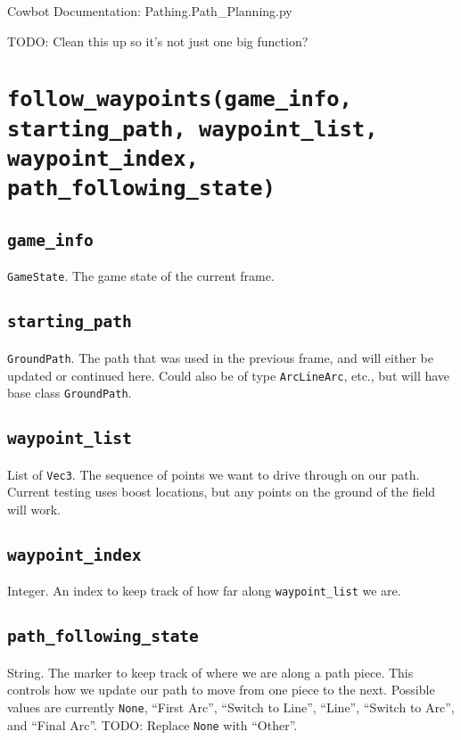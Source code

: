 \documentclass{article}
\newcommand{\function}[1]{\section{\texttt{#1}}}
\newcommand{\argumenta}[1]{\subsection{\texttt{#1}}}
\begin{document}
\begin{flushleft}

\begin{center}
  Cowbot Documentation: Pathing.Path\_Planning.py
\end{center}


TODO: Clean this up so it's not just one big function?




\function{follow\_waypoints(game\_info, starting\_path, waypoint\_list, waypoint\_index, path\_following\_state)}
         {
           \argumenta{game\_info}
                     {
                       \texttt{GameState}.  The game state of the current frame.
                     }
           \argumenta{starting\_path}
                     {
                       \texttt{GroundPath}.  The path that was used in the previous frame, and will either be updated or continued here.  Could also be of type \texttt{ArcLineArc}, etc., but will have base class \texttt{GroundPath}.
                     }
           \argumenta{waypoint\_list}
                     {
                       List of \texttt{Vec3}.  The sequence of points we want to drive through on our path.  Current testing uses boost locations, but any points on the ground of the field will work.
                     }
           \argumenta{waypoint\_index}
                     {
                       Integer.  An index to keep track of how far along \texttt{waypoint\_list} we are.
                     }
           \argumenta{path\_following\_state}
                     {
                       String.  The marker to keep track of where we are along a path piece.  This controls how we update our path to move from one piece to the next.  Possible values are currently \texttt{None}, ``First Arc'', ``Switch to Line'', ``Line'', ``Switch to Arc'', and ``Final Arc''.  TODO: Replace \texttt{None} with ``Other''.
                     }
         }
         









  
  





\end{flushleft}
\end{document}
